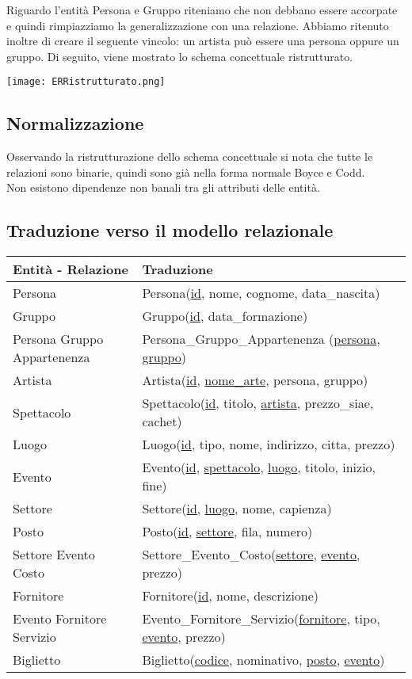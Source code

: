 \documentclass[a4paper,11pt]{article}
\begin{document}
Riguardo l'entità Persona e Gruppo riteniamo che non debbano essere accorpate e quindi rimpiazziamo la generalizzazione con una relazione.
Abbiamo ritenuto inoltre di creare il seguente vincolo: un artista può essere una persona oppure un gruppo.
Di seguito, viene mostrato lo schema concettuale ristrutturato.

\texttt{[image: ERRistrutturato.png]}

\subsection{Normalizzazione}

Osservando la ristrutturazione dello schema concettuale si nota che tutte le relazioni sono binarie, quindi sono già nella forma normale Boyce e Codd.\\
Non esistono dipendenze non banali tra gli attributi delle entità.

\subsection{Traduzione verso il modello relazionale}
\begin{tabularx}{\textwidth}{|X|>{\raggedright\arraybackslash}X|}
\hline
  \textbf{Entità - Relazione} & \textbf{Traduzione}\\
\hline
  Persona & Persona(\underline{id}, nome, cognome, data\_nascita) \\
\hline
  Gruppo & Gruppo(\underline{id}, data\_formazione) \\
\hline
  Persona Gruppo Appartenenza & Persona\_Gruppo\_Appartenenza (\underline{persona}, \underline{gruppo}) \\
\hline
  Artista & Artista(\underline{id}, \underline{nome\_arte}, persona, gruppo) \\
\hline
  Spettacolo & Spettacolo(\underline{id}, titolo, \underline{artista}, prezzo\_siae, cachet) \\
\hline
  Luogo & Luogo(\underline{id}, tipo, nome, indirizzo, citta, prezzo) \\
\hline
  Evento & Evento(\underline{id}, \underline{spettacolo}, \underline{luogo}, titolo, inizio, fine) \\
\hline
  Settore & Settore(\underline{id}, \underline{luogo}, nome, capienza) \\
\hline
  Posto & Posto(\underline{id}, \underline{settore}, fila, numero) \\
\hline
  Settore Evento Costo & Settore\_Evento\_Costo(\underline{settore}, \underline{evento}, prezzo) \\
\hline
  Fornitore & Fornitore(\underline{id}, nome, descrizione) \\
\hline
  Evento Fornitore Servizio & Evento\_Fornitore\_Servizio(\underline{fornitore}, tipo, \underline{evento}, prezzo) \\
\hline
  Biglietto & Biglietto(\underline{codice}, nominativo, \underline{posto}, \underline{evento}) \\
\hline
\end{tabularx}
\end{document}
